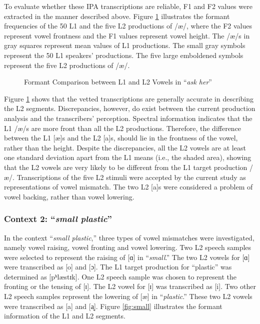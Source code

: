 To evaluate whether these IPA transcriptions are reliable, F1 and F2 values were extracted in the manner described above. Figure \ref{fig:ask} illustrates the formant frequencies of the 50 L1 and the five L2 productions of /æ/, where the F2 values represent vowel frontness and the F1 values represent vowel height. The /æ/s in gray squares represent mean values of L1 productions. The small gray symbols represent the 50 L1 speakers’ productions. The five large emboldened symbols represent the five L2  productions of /æ/. 

\begin{figure}[h]
  \figSpace
    \centering
    
    \caption{Formant Comparison between L1 and L2 Vowels in “\textit{ask her}”}
    \label{fig:ask}
  \figSpace
\end{figure}

Figure \ref{fig:ask} shows that the vetted transcriptions are generally accurate in describing the L2 segments. Discrepancies, however, do exist between the current production analysis and the transcribers’ perception. Spectral information indicates that the L1 /æ/s are more front than all the L2 productions. Therefore, the difference between the L1 [æ]s and the L2 [a]s, should lie in the frontness of the vowel, rather than the height. Despite the discrepancies, all the L2 vowels are at least one standard deviation apart from the L1 means (i.e., the shaded area), showing that the L2 vowels are very likely to be different from the L1 target production /æ/. Transcriptions of the five L2 stimuli were accepted by the current study as representations of vowel mismatch. The two L2 [a]s were considered a problem of vowel backing, rather than vowel lowering.

\subsubsection{Context 2: “\textit{small plastic}”}

In the context “\textit{small plastic},” three types of vowel mismatches were investigated, namely vowel raising, vowel fronting and vowel lowering. Two L2 speech samples were selected to represent the raising of [ɑ] in “\textit{small}.” The two L2 vowels for  [ɑ] were transcribed as [o] and [ɔ]. The L1 target production for “plastic” was determined as [pʰlæstɪk]. One L2 speech sample was chosen to represent the fronting or the tensing of [ɪ]. The L2 vowel for [ɪ] was transcribed as [i]. Two other L2  speech samples represent the lowering of [æ] in “\textit{plastic}.” These two L2 vowels were transcribed as [a] and [a̝]. Figure \ref{fig:small} illustrates the formant information of the L1 and L2 segments. 

